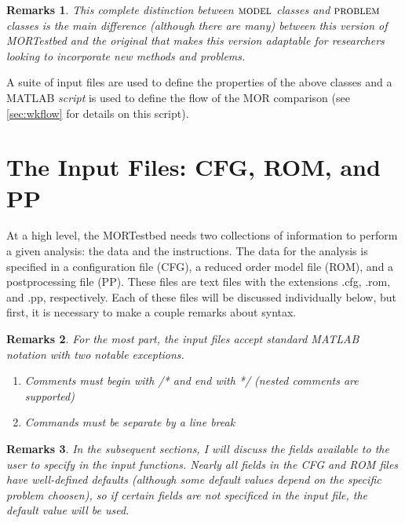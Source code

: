 \documentclass[notitlepage]{report}
\newtheorem*{Rem}{Remarks}
\newcommand{\model}{\ensuremath{\textsc{model }}}
\newcommand{\problem}{\ensuremath{\textsc{problem }}}
\begin{document}
\begin{Rem}
  This complete distinction between \model classes and \problem classes is the main difference (although there are many) between this version of MORTestbed and the original that makes this version adaptable for researchers looking to incorporate new methods and problems.
\end{Rem}

A suite of input files are used to define the properties of the above classes and a MATLAB \emph{script} is used to define the flow of the MOR comparison (see \ref{sec:wkflow} for details on this script).


\section{The Input Files: CFG, ROM, and PP}
At a high level, the MORTestbed needs two collections of information to perform a given analysis: the data and the instructions.  The data for the analysis is specified in a configuration file (CFG), a reduced order model file (ROM), and a postprocessing file (PP).  These files are text files with the extensions .cfg, .rom, and .pp, respectively.  Each of these files will be discussed individually below, but first, it is necessary to make a couple remarks about syntax.

\begin{Rem}
For the most part, the input files accept standard MATLAB notation with two notable exceptions.
  \begin{enumerate}
     \item Comments must begin with /* and end with */ (nested comments are supported)
     \item Commands must be separate by a line break
  \end{enumerate}
\end{Rem}

\begin{Rem}
In the subsequent sections, I will discuss the fields available to the user to specify in the input functions.  Nearly all fields in the CFG and ROM files have well-defined defaults (although some default values depend on the specific problem choosen), so if certain fields are not specificed in the input file, the default value will be used.
\end{Rem}
\end{document}
